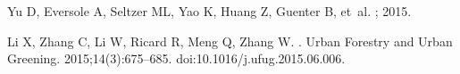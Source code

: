 \documentclass[10pt,letterpaper]{article}
\begin{document}
\begin{thebibliography}{}
Yu D, Eversole A, Seltzer ML, Yao K, Huang Z, Guenter B, et~al.
; 2015.

Li X, Zhang C, Li W, Ricard R, Meng Q, Zhang W.
.
\newblock Urban Forestry and Urban Greening. 2015;14(3):675--685.
\newblock doi:{10.1016/j.ufug.2015.06.006}.

\end{thebibliography}
\end{document}
